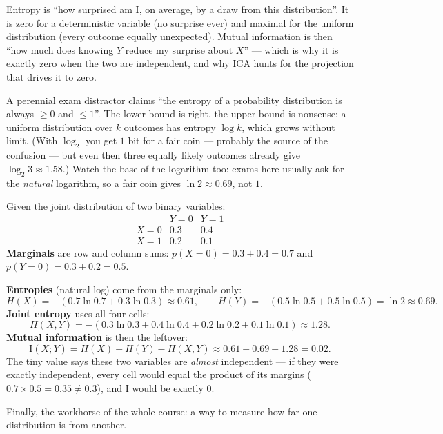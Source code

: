 \documentclass[11pt, oneside]{book}
\newcommand{\MI}{\mathrm{I}}
\begin{document}
Entropy is ``how surprised am I, on average, by a draw from this distribution''.
It is zero for a deterministic variable (no surprise ever) and maximal for the
uniform distribution (every outcome equally unexpected).
Mutual information is then ``how much does knowing $Y$ reduce my surprise about
$X$'' --- which is why it is exactly zero when the two are independent, and why
ICA hunts for the projection that drives it to zero.

\begin{notebox}[title={Entropy is not bounded by 1}]
A perennial exam distractor claims ``the entropy of a probability distribution
is always $\geq 0$ and $\leq 1$''.
The lower bound is right, the upper bound is nonsense: a uniform distribution
over $k$ outcomes has entropy $\log k$, which grows without limit.
(With $\log_2$ you get $1$ bit for a fair coin --- probably the source of the
confusion --- but even then three equally likely outcomes already give
$\log_2 3 \approx 1.58$.)
Watch the base of the logarithm too: exams here usually ask for the
\emph{natural} logarithm, so a fair coin gives $\ln 2 \approx 0.69$, not $1$.
\end{notebox}

\begin{exbox}[title={Computing marginals, entropies, and mutual information}]
Given the joint distribution of two binary variables:
\[
\begin{array}{c|cc}
 & Y=0 & Y=1\\
\hline
X=0 & 0.3 & 0.4\\
X=1 & 0.2 & 0.1
\end{array}
\]
\textbf{Marginals} are row and column sums:
$p(X{=}0)=0.3+0.4=0.7$ and $p(Y{=}0)=0.3+0.2=0.5$.

\textbf{Entropies} (natural log) come from the marginals only:
\[
  H(X) = -(0.7\ln 0.7 + 0.3\ln 0.3) \approx 0.61,
  \qquad
  H(Y) = -(0.5\ln 0.5 + 0.5\ln 0.5) = \ln 2 \approx 0.69.
\]
\textbf{Joint entropy} uses all four cells:
\[
  H(X,Y) = -(0.3\ln 0.3 + 0.4\ln 0.4 + 0.2\ln 0.2 + 0.1\ln 0.1) \approx 1.28.
\]
\textbf{Mutual information} is then the leftover:
\[
  \MI(X;Y) = H(X) + H(Y) - H(X,Y) \approx 0.61 + 0.69 - 1.28 = 0.02.
\]
The tiny value says these two variables are \emph{almost} independent --- if they
were exactly independent, every cell would equal the product of its margins
($0.7\times0.5=0.35 \neq 0.3$), and $\MI$ would be exactly $0$.
\end{exbox}

Finally, the workhorse of the whole course: a way to measure how far one
distribution is from another.
\end{document}
